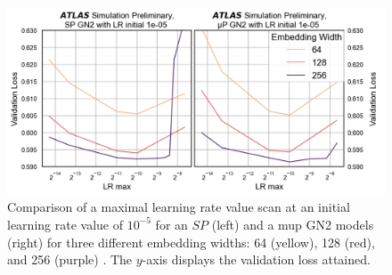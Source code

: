\begin{figure}[h!]
  \centering
  \includegraphics[width=\textwidth]{Images/FTAG/GN/HPO/maincompmupsp.png}
  \caption{Comparison of a maximal learning rate value scan at an initial learning rate value of $10^{-5}$ for an $SP$ (left) and a \gls{mup} GN2 models (right) for three different embedding widths: 64 (yellow), 128 (red), and 256 (purple) \cite{publicplotMUP}. The $y$-axis displays the validation loss attained.}
  \label{fig:maincompmupsp}
\end{figure} 

